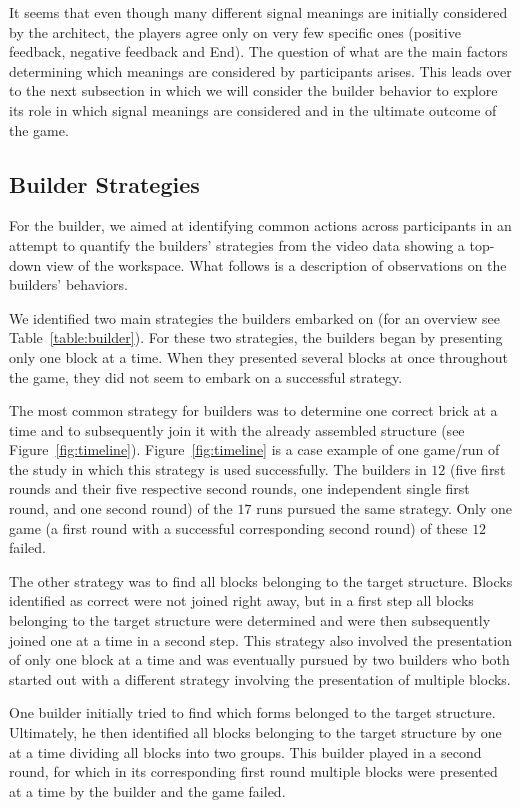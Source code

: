 It seems that even though many different signal meanings are initially considered by the architect, the players agree only on very few specific ones (positive feedback, negative feedback and End). The question of what are the main factors determining which meanings are considered by participants arises. This leads over to the next subsection in which we will consider the builder behavior to explore its role in which signal meanings are considered and in the ultimate outcome of the game.

\subsection{Builder Strategies}
\label{sec:builder}

For the builder, we aimed at identifying common actions across participants in an attempt to quantify the builders' strategies from the video data showing a top-down view of the workspace.
What follows is a description of observations on the builders' behaviors.

We identified two main strategies the builders embarked on (for an overview see Table~\ref{table:builder}). For these two strategies, the builders began by presenting only one block at a time. When they presented several blocks at once throughout the game, they did not seem to embark on a successful strategy.

The most common strategy for builders was to determine one correct brick at a time and to subsequently join it with the already assembled structure (see Figure~\ref{fig:timeline}). Figure~\ref{fig:timeline} is a case example of one game/run of the study in which this strategy is used successfully. The builders in $12$ (five first rounds and their five respective second rounds, one independent single first round, and one second round) of the $17$ runs pursued the same strategy. Only one game (a first round with a successful corresponding second round) of these $12$ failed.

The other strategy was to find all blocks belonging to the target structure. Blocks identified as correct were not joined right away, but in a first step all blocks belonging to the target structure were determined and were then subsequently joined one at a time in a second step. This strategy also involved the presentation of only one block at a time and was eventually pursued by two builders who both started out with a different strategy involving the presentation of multiple blocks. 

One builder initially tried to find which forms belonged to the target structure. Ultimately, he then identified all blocks belonging to the target structure by one at a time dividing all blocks into two groups. This builder played in a second round, for which in its corresponding first round multiple blocks were presented at a time by the builder and the game failed.

